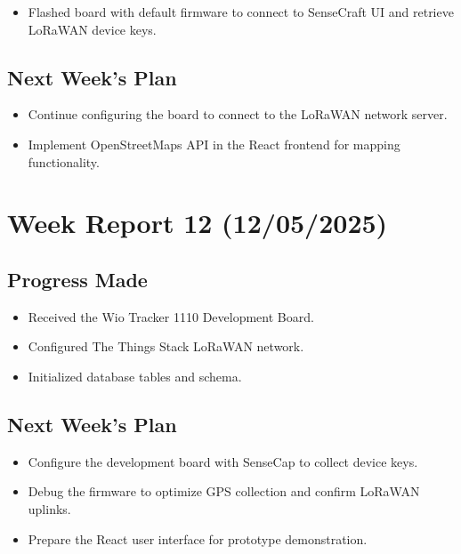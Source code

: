 \begin{itemize}
    \item Flashed board with default firmware to connect to SenseCraft UI and retrieve LoRaWAN device keys.

\end{itemize}

\subsection{Next Week's Plan}
\begin{itemize}
    \item Continue configuring the board to connect to the LoRaWAN network server.
    \item Implement OpenStreetMaps API in the React frontend for mapping functionality.
\end{itemize}


\section{Week Report 12 (12/05/2025)}
\label{sec:report12}

\subsection{Progress Made}
\begin{itemize}
    \item Received the Wio Tracker 1110 Development Board.
    \item Configured The Things Stack LoRaWAN network.
    \item Initialized database tables and schema.
\end{itemize}

\subsection{Next Week's Plan}
\begin{itemize}
    \item Configure the development board with SenseCap to collect device keys.
    \item Debug the firmware to optimize GPS collection and confirm LoRaWAN uplinks.
    \item Prepare the React user interface for prototype demonstration.
\end{itemize}


